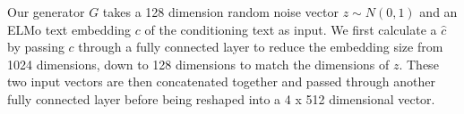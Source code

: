 Our generator $G$ takes a 128 dimension random noise vector $z \sim N(0, 1)$ and an ELMo text embedding $c$ of the conditioning text as input. We first calculate a  $\hat{c}$ by passing $c$ through a fully connected layer to reduce the embedding size from 1024 dimensions, down to 128 dimensions to match the dimensions of $z$. These two input vectors are then concatenated together and passed through another fully connected layer before being reshaped into a 4 x 512 dimensional vector.